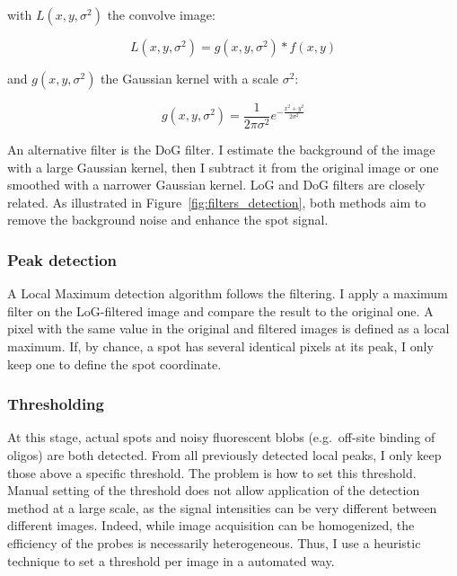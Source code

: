 \noindent
with $L(x, y, \sigma^2)$ the convolve image:

\begin{equation}
	{\displaystyle L(x, y, \sigma^2) = g(x, y, \sigma^2) * f(x, y)}
\end{equation}

\noindent
and $g(x, y, \sigma^2)$ the Gaussian kernel with a scale $\sigma^2$:

\begin{equation}
	{\displaystyle g(x, y, \sigma^2) = \frac{1}{2\pi \sigma^2} e^{-{\frac{x^{2} + y^{2}}{2\sigma^2}}}}
\end{equation}

An alternative filter is the \ac{DoG} filter.
I estimate the background of the image with a large Gaussian kernel, then I subtract it from the original image or one smoothed with a narrower Gaussian kernel.
\ac{LoG} and \ac{DoG} filters are closely related.
As illustrated in Figure~\ref{fig:filters_detection}, both methods aim to remove the background noise and enhance the spot signal.

\subsubsection{Peak detection}

A Local Maximum detection algorithm follows the filtering.
I apply a maximum filter on the \ac{LoG}-filtered image and compare the result to the original one.
A pixel with the same value in the original and filtered images is defined as a local maximum.
If, by chance, a spot has several identical pixels at its peak, I only keep one to define the spot coordinate.

\subsubsection{Thresholding}

At this stage, actual spots and noisy fluorescent blobs (e.g.~off-site binding of oligos) are both detected.
From all previously detected local peaks, I only keep those above a specific threshold.
The problem is how to set this threshold.
Manual setting of the threshold does not allow application of the detection method at a large scale, as the signal intensities can be very different between different images.
Indeed, while image acquisition can be homogenized, the efficiency of the probes is necessarily heterogeneous.
Thus, I use a heuristic technique to set a threshold per image in a automated way.

